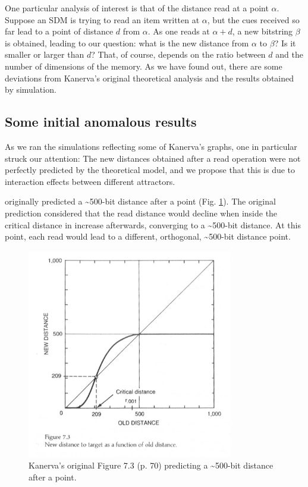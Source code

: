 One particular analysis of interest is that of the distance read at a point $\alpha$. Suppose an SDM is trying to read an item written at $\alpha$, but the cues received so far lead to a point of distance $d$ from $\alpha$.  As one reads at $\alpha+d$, a new bitstring $\beta$ is obtained, leading to our question: what is the new distance from $\alpha$ to $\beta$? Is it smaller or larger than $d$? That, of course, depends on the ratio between $d$ and the number of dimensions of the memory.  As we have found out, there are some deviations from Kanerva's original theoretical analysis and the results obtained by simulation.

\subsection{Some initial anomalous results}

As we ran the simulations reflecting some of Kanerva's graphs, one in particular struck our attention: The new distances obtained after a read operation were not perfectly predicted by the theoretical model, and we propose that this is due to interaction effects between different attractors.

\citet{Kanerva1988} originally predicted a \textasciitilde 500-bit distance after a point (Fig. \ref{kanerva-table-7-2}). The original prediction considered that the read distance would decline when inside the critical distance in increase afterwards, converging to a \textasciitilde 500-bit distance.  At this point, each read would lead to a different, orthogonal, \textasciitilde 500-bit distance point.

\begin{figure}[h]
\centering\includegraphics[width=0.8\textwidth]{images02/kanerva-table-7-2-original.png}
\caption{Kanerva's original Figure 7.3 (p. 70) predicting a \textasciitilde 500-bit distance after a point.
\label{kanerva-table-7-2}}
\end{figure}

